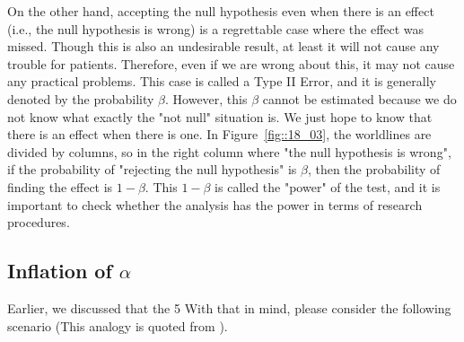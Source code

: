 \documentclass{ltjsbook}
\begin{document}
On the other hand, accepting the null hypothesis even when there is an effect (i.e., the null hypothesis is wrong) is a regrettable case where the effect was missed. Though this is also an undesirable result, at least it will not cause any trouble for patients. Therefore, even if we are wrong about this, it may not cause any practical problems. This case is called a Type II Error, and it is generally denoted by the probability $\beta$. However, this $\beta$ cannot be estimated because we do not know what exactly the "not null" situation is. We just hope to know that there is an effect when there is one. In Figure~\ref{fig::18_03}, the worldlines are divided by columns, so in the right column where "the null hypothesis is wrong", if the probability of "rejecting the null hypothesis" is $\beta$, then the probability of finding the effect is $1-\beta$. This $1-\beta$ is called the "power" of the test, and it is important to check whether the analysis has the power in terms of research procedures.

\subsection{Inflation of $\alpha$}
\label{alphaInfration}
Earlier, we discussed that the 5%
With that in mind, please consider the following scenario (This analogy is quoted from \textcite{BA33892274}).

\end{document}
